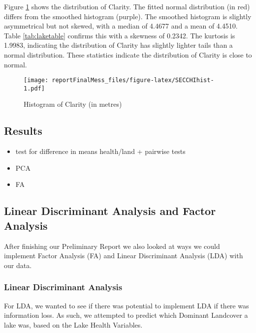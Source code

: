 \documentclass[
]{article}
\providecommand{\tightlist}{%
  \setlength{\itemsep}{0pt}\setlength{\parskip}{0pt}}
\begin{document}
Figure \ref{fig:SECCHIhist} shows the distribution of Clarity. The fitted normal distribution (in red) differs from the smoothed histogram (purple). The smoothed histogram is slightly asymmetrical but not skewed, with a median of 4.4677 and a mean of 4.4510. Table \ref{tab:laketable} confirms this with a skewness of 0.2342. The kurtosis is 1.9983, indicating the distribution of Clarity has slightly lighter tails than a normal distribution. These statistics indicate the distribution of Clarity is close to normal.

\begin{figure}
\centering
\texttt{[image: reportFinalMess\_files/figure-latex/SECCHIhist-1.pdf]}
\caption{\label{fig:SECCHIhist}Histogram of Clarity (in metres)}
\end{figure}

\hypertarget{results}{%
\subsection{Results}\label{results}}

\begin{itemize}
\tightlist
\item
  test for difference in means health/land + pairwise tests
\item
  PCA
\item
  FA
\end{itemize}

\hypertarget{linear-discriminant-analysis-and-factor-analysis}{%
\subsection{Linear Discriminant Analysis and Factor Analysis}\label{linear-discriminant-analysis-and-factor-analysis}}

After finishing our Preliminary Report we also looked at ways we could implement Factor Analysis (FA) and Linear Discriminant Analysis (LDA) with our data.

\hypertarget{linear-discriminant-analysis}{%
\subsubsection{Linear Discriminant Analysis}\label{linear-discriminant-analysis}}

For LDA, we wanted to see if there was potential to implement LDA if there was information loss. As such, we attempted to predict which Dominant Landcover a lake was, based on the Lake Health Variables.
\end{document}
